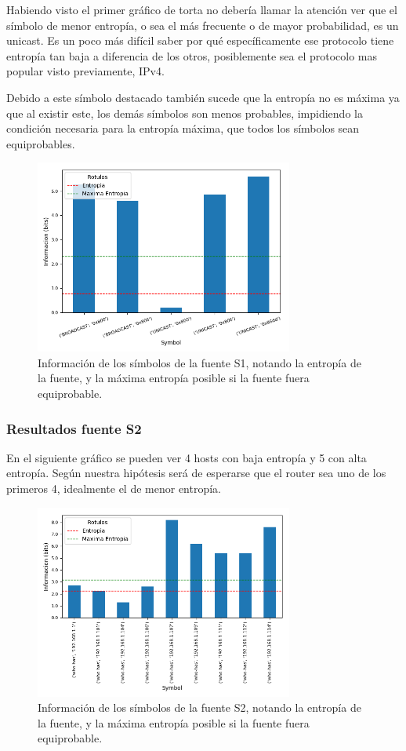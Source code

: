 Habiendo visto el primer gráfico de torta no debería llamar la atención ver que el símbolo de menor entropía, o sea el más frecuente o de mayor probabilidad, es un unicast. Es un poco más difícil saber por qué específicamente ese protocolo tiene entropía tan baja a diferencia de los otros, posiblemente sea el protocolo mas popular visto previamente, IPv4.

Debido a este símbolo destacado también sucede que la entropía no es máxima ya que al existir este, los demás símbolos son menos probables, impidiendo la condición necesaria para la entropía máxima, que todos los símbolos sean equiprobables.

\begin{figure}[H]
 \centering
 \includegraphics[width=8.5cm]{figs/information_hogar_ethernet_S1_output.png}
 \caption{\normalfont Información de los símbolos de la fuente S1, notando la entropía de la fuente, y la máxima entropía posible si la fuente fuera equiprobable.}
\end{figure}

\subsubsection*{Resultados fuente S2}

En el siguiente gráfico se pueden ver 4 hosts con baja entropía y 5 con alta entropía. Según nuestra hipótesis será de esperarse que el router sea uno de los primeros 4, idealmente el de menor entropía.

\begin{figure}[H]
 \centering
 \includegraphics[width=8.5cm]{figs/information_hogar_ethernet_S2_output.png}
 \caption{\normalfont Información de los símbolos de la fuente S2, notando la entropía de la fuente, y la máxima entropía posible si la fuente fuera equiprobable.}
\end{figure}


